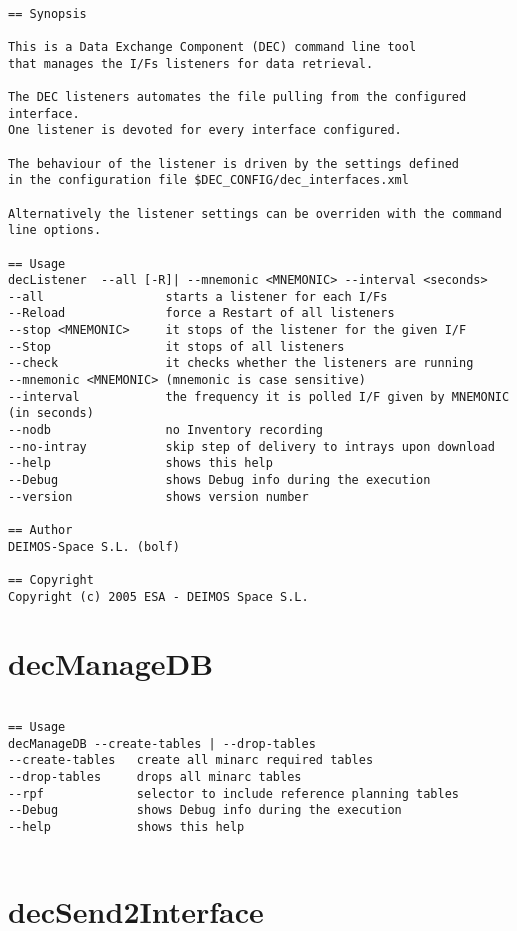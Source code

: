 \documentclass[dec_sum_main.tex]{subfiles}
\begin{document}
\begin{verbatim}

== Synopsis

This is a Data Exchange Component (DEC) command line tool 
that manages the I/Fs listeners for data retrieval.

The DEC listeners automates the file pulling from the configured interface.
One listener is devoted for every interface configured.

The behaviour of the listener is driven by the settings defined
in the configuration file $DEC_CONFIG/dec_interfaces.xml

Alternatively the listener settings can be overriden with the command line options.

== Usage
decListener  --all [-R]| --mnemonic <MNEMONIC> --interval <seconds>
--all                 starts a listener for each I/Fs
--Reload              force a Restart of all listeners
--stop <MNEMONIC>     it stops of the listener for the given I/F
--Stop                it stops of all listeners
--check               it checks whether the listeners are running
--mnemonic <MNEMONIC> (mnemonic is case sensitive)
--interval            the frequency it is polled I/F given by MNEMONIC (in seconds)
--nodb                no Inventory recording
--no-intray           skip step of delivery to intrays upon download
--help                shows this help
--Debug               shows Debug info during the execution
--version             shows version number      

== Author
DEIMOS-Space S.L. (bolf)

== Copyright
Copyright (c) 2005 ESA - DEIMOS Space S.L.

\end{verbatim}

\section{decManageDB}

\begin{verbatim}

== Usage
decManageDB --create-tables | --drop-tables
--create-tables   create all minarc required tables
--drop-tables     drops all minarc tables
--rpf             selector to include reference planning tables
--Debug           shows Debug info during the execution
--help            shows this help


\end{verbatim}

\section{decSend2Interface}
\end{document}
